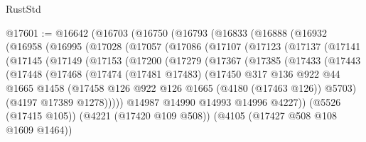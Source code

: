 \begin{lexlean}{RustStd}
\begin{coremodule}
{\begin{coremodule}
{{{{{{{{{{{{{{{{{{{{{{{{{{{{{{{@17601 := @16642
    (@16703
      (@16750
        (@16793
          (@16833
            (@16888
              (@16932
                (@16958
                  (@16995
                    (@17028
                      (@17057
                        (@17086
                          (@17107
                            (@17123
                              (@17137
                                (@17141
                                  (@17145
                                    (@17149
                                      (@17153
                                        (@17200
                                          (@17279
                                            (@17367
                                              (@17385
                                                (@17433
                                                  (@17443
                                                    (@17448
                                                      (@17468
                                                        (@17474
                                                          (@17481 @17483)
                                                          (@17450
                                                            @317
                                                            @136
                                                            @922
                                                            @44
                                                            @1665
                                                            @1458
                                                            (@17458
                                                              @126
                                                              @922
                                                              @126
                                                              @1665
                                                              (@4180 (@17463 @126))
                                                              @5703)
                                                            (@4197 @17389 @1278)))))
                                                    @14987
                                                    @14990
                                                    @14993
                                                    @14996
                                                    @4227))
                                                (@5526 (@17415 @105))
                                                (@4221 (@17420 @109 @508))
                                                (@4105 (@17427 @508 @108 @1609 @1464))
}}}}}}}}}}}}}}}}}}}}}}}}}}}}}}}
\end{coremodule}}
\end{coremodule}
\end{lexlean}
